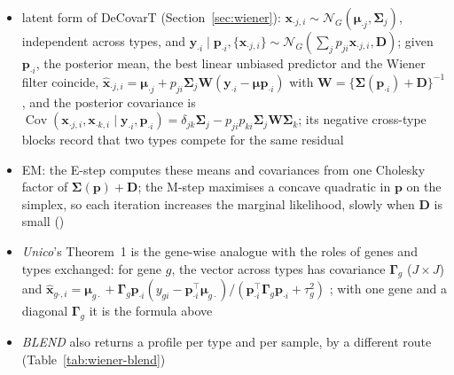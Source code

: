 \begin{itemize}
  \item latent form of DeCovarT (Section~\ref{sec:wiener}): \(\boldsymbol{x}_{\cdot j,i}\sim\mathcal{N}_{G}(\boldsymbol{\mu}_{\cdot j},\boldsymbol{\Sigma}_{j})\), independent
        across types, and \(\boldsymbol{y}_{\cdot i}\mid\boldsymbol{p}_{\cdot i},\{\boldsymbol{x}_{\cdot j,i}\}\sim\mathcal{N}_{G}(\sum_{j}p_{ji}\boldsymbol{x}_{\cdot j,i},\boldsymbol{D})\); given
        \(\boldsymbol{p}_{\cdot i}\), the posterior mean, the best linear unbiased predictor and the Wiener filter coincide,
        \(\hat{\boldsymbol{x}}_{\cdot j,i}=\boldsymbol{\mu}_{\cdot j}+p_{ji}\boldsymbol{\Sigma}_{j}\boldsymbol{W}(\boldsymbol{y}_{\cdot i}-\boldsymbol{\mu}\boldsymbol{p}_{\cdot i})\) with
        \(\boldsymbol{W}=\{\boldsymbol{\Sigma}(\boldsymbol{p}_{\cdot i})+\boldsymbol{D}\}^{-1}\), and the posterior covariance is
        \(\operatorname{Cov}(\boldsymbol{x}_{\cdot j,i},\boldsymbol{x}_{\cdot k,i}\mid\boldsymbol{y}_{\cdot i},\boldsymbol{p}_{\cdot i})=\delta_{jk}\boldsymbol{\Sigma}_{j}-p_{ji}p_{ki}\boldsymbol{\Sigma}_{j}\boldsymbol{W}\boldsymbol{\Sigma}_{k}\);
        its negative cross-type blocks record that two types compete for the same residual
  \item EM: the E-step computes these means and covariances from one Cholesky factor of
        \(\boldsymbol{\Sigma}(\boldsymbol{p})+\boldsymbol{D}\); the M-step maximises a concave quadratic in \(\boldsymbol{p}\) on the simplex,
        so each iteration increases the marginal likelihood, slowly when \(\boldsymbol{D}\) is small
        ()
  \item \emph{Unico}'s Theorem~1 is the gene-wise analogue with the roles of genes and types exchanged: for gene \(g\), the
        vector across types has covariance \(\boldsymbol{\Gamma}_{g}\) (\(J\times J\)) and
        \(\hat{\boldsymbol{x}}_{g\cdot,i}=\boldsymbol{\mu}_{g\cdot}+\boldsymbol{\Gamma}_{g}\boldsymbol{p}_{\cdot i}(y_{gi}-\boldsymbol{p}_{\cdot i}^{\top}\boldsymbol{\mu}_{g\cdot})/(\boldsymbol{p}_{\cdot i}^{\top}\boldsymbol{\Gamma}_{g}\boldsymbol{p}_{\cdot i}+\tau_{g}^{2})\)
        \cite[p.~12]{chenUnicoUnifiedModelCell2025}; with one gene and a diagonal \(\boldsymbol{\Gamma}_{g}\) it is the formula above
  \item \emph{BLEND} \cite{huangBLENDProbabilisticCellular2024} also returns a profile per type and per sample, by a different
        route (Table~\ref{tab:wiener-blend})
  \begin{itemize}

\end{itemize}
\end{itemize}
